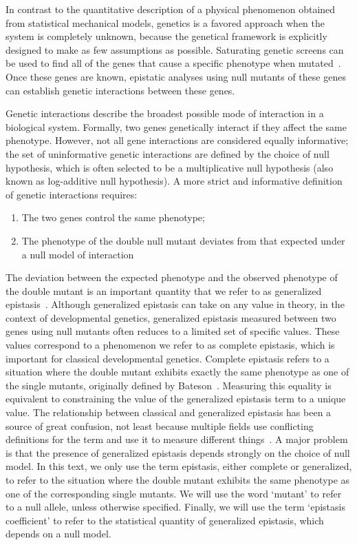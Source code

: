 In contrast to the quantitative description of a physical phenomenon obtained
from statistical mechanical models, genetics is a favored approach when the
system is completely unknown, because the genetical framework is explicitly
designed to make as few assumptions as possible. Saturating genetic screens can
be used to find all of the genes that cause a specific phenotype when
mutated~\citep{Brenner1974,Jurgens1984}. Once these genes are known, epistatic
analyses using null mutants of these genes can establish genetic interactions
between these genes.

Genetic interactions describe the broadest possible mode of interaction in a
biological system. Formally, two genes genetically interact if they affect the
same phenotype. However, not all gene interactions are considered equally
informative; the set of uninformative genetic interactions are defined by the
choice of null hypothesis, which is often selected to be a multiplicative null
hypothesis (also known as log-additive null hypothesis). A more strict and
informative definition of genetic interactions requires:

\begin{enumerate}
  \item The two genes control the same phenotype;
  \item The phenotype of the double null mutant deviates from that expected
  under a null model of interaction
\end{enumerate}

The deviation between the expected phenotype and the observed phenotype of the
double mutant is an important quantity that we refer to as generalized
epistasis~\citep{Fisher1919}. Although generalized epistasis can take on any
value in theory, in the context of developmental genetics, generalized epistasis
measured between two genes using null mutants often reduces to a limited set of
specific values. These values correspond to a phenomenon we refer to as complete
epistasis, which is important for classical developmental genetics. Complete
epistasis refers to a situation where the double mutant exhibits exactly the
same phenotype as one of the single mutants, originally defined by
Bateson~\citep{Bateson2009}. Measuring this equality is equivalent to
constraining the value of the generalized epistasis term to a unique value.
The relationship between classical and generalized epistasis has been a source
of great confusion, not least because multiple fields use conflicting
definitions for the term and use it to measure different
things~\citep{Cordell2002,Phillips2008}. A major problem is that the presence of
generalized epistasis depends strongly on the choice of null model. In this
text, we only use the term epistasis, either complete or generalized, to refer
to the situation where the double mutant exhibits the same phenotype as one of
the corresponding single mutants. We will use the word `mutant' to refer to a
null allele, unless otherwise specified. Finally, we will use the term
`epistasis coefficient' to refer to the statistical quantity of generalized
epistasis, which depends on a null model.

